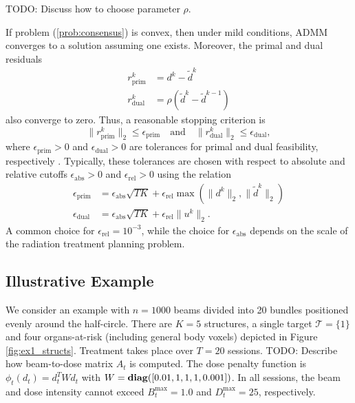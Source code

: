 \documentclass[12pt]{article}
\begin{document}
TODO: Discuss how to choose parameter $\rho$.

If problem (\ref{prob:consensus}) is convex, then under mild conditions, ADMM converges to a solution assuming one exists. Moreover, the primal and dual residuals
\begin{align}
\label{eq:opt_residual}
r_{\text{prim}}^k &= d^k - \tilde d^k \\
r_{\text{dual}}^k &= \rho(\tilde d^k - \tilde d^{k-1})
\end{align}
also converge to zero. Thus, a reasonable stopping criterion is
\[
	\|r_{\text{prim}}^k\|_2 \leq \epsilon_{\text{prim}} \quad \mbox{and} \quad \|r_{\text{dual}}^k\|_2 \leq \epsilon_{\text{dual}},
\]
where $\epsilon_{\text{prim}} > 0$ and $\epsilon_{\text{dual}} > 0$ are tolerances for primal and dual feasibility, respectively \cite[\S 3.3.1]{ADMM}. Typically, these tolerances are chosen with respect to absolute and relative cutoffs $\epsilon_{\text{abs}} > 0$ and $\epsilon_{\text{rel}} > 0$ using the relation \cite[\S 3.3.1]{ADMM}
\begin{align*}
	\epsilon_{\text{prim}} &= \epsilon_{\text{abs}}\sqrt{TK} + \epsilon_{\text{rel}}\max(\|d^k\|_2, \|\tilde d^k\|_2) \\
	\epsilon_{\text{dual}} &= \epsilon_{\text{abs}}\sqrt{TK} + \epsilon_{\text{rel}}\|u^k\|_2.
\end{align*}
A common choice for $\epsilon_{\text{rel}} = 10^{-3}$, while the choice for $\epsilon_{\text{abs}}$ depends on the scale of the radiation treatment planning problem.

\subsection{Illustrative Example}
\label{sec:ex_simple}
We consider an example with $n = 1000$ beams divided into 20 bundles positioned evenly around the half-circle. There are $K = 5$ structures, a single target $\mathcal{T} = \{1\}$ and four organs-at-risk (including general body voxels) depicted in Figure \ref{fig:ex1_structs}. Treatment takes place over $T = 20$ sessions.
TODO: Describe how beam-to-dose matrix $A_t$ is computed.
The dose penalty function is $\phi_t(d_t) = d_t^TWd_t$ with $W = \mathop{\bf diag}([0.01,1,1,1,0.001])$. In all sessions, the beam and dose intensity cannot exceed $B_t^{\max} = 1.0$ and $D_t^{\max} = 25$, respectively.
\end{document}
